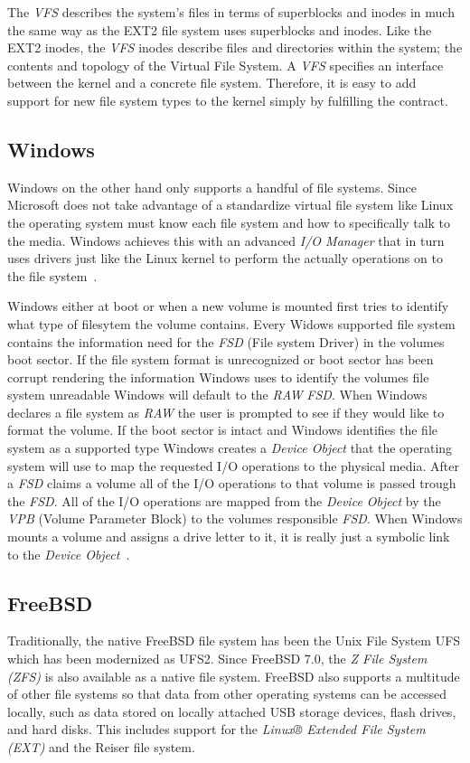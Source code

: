 \documentclass[10pt,draftclsnofoot,onecolumn,journal,compsoc]{IEEEtran}
\begin{document}
The \textit{VFS} describes the system's files in terms of superblocks and inodes in much the same way as the EXT2 file system uses superblocks and inodes. Like the EXT2 inodes, the \textit{VFS} inodes describe files and directories within the system; the contents and topology of the Virtual File System. A \textit{VFS} specifies an interface between the kernel and a concrete file system. Therefore, it is easy to add support for new file system types to the kernel simply by fulfilling the contract. 

\subsection*{Windows} 
Windows on the other hand only supports a handful of file systems. Since Microsoft does not take advantage of a standardize virtual file system like Linux the operating system must know each file system and how to specifically talk to the media. Windows achieves this with an advanced \textit{I/O Manager} that in turn uses drivers just like the Linux kernel to perform the actually operations on to the file system~\cite{Wini}. 

Windows either at boot or when a new volume is mounted first tries to identify what type of filesytem the volume contains. Every Widows supported file system contains the information need for the \textit{FSD} (File system Driver) in the volumes boot sector. If the file system format is unrecognized or boot sector has been corrupt rendering the information Windows uses to identify the volumes file system unreadable Windows will default to the \textit{RAW} \textit{FSD}. When Windows declares a file system as \textit{RAW} the user is prompted to see if they would like to format the volume. If the boot sector is intact and Windows identifies the file system as a supported type Windows creates a \textit{Device Object} that the operating system will use to map the requested I/O operations to the physical media. After a \textit{FSD} claims a volume all of the I/O operations to that volume is passed trough the \textit{FSD}. All of the I/O operations are mapped from the \textit{Device Object} by the \textit{VPB} (Volume Parameter Block) to the volumes responsible \textit{FSD}. When Windows mounts a volume and assigns a drive letter to it, it is really just a symbolic link to the \textit{Device Object}~\cite{Wini}.

\subsection*{FreeBSD}
Traditionally, the native FreeBSD file system has been the Unix File System UFS which has been modernized as UFS2. Since FreeBSD 7.0, the \textit{Z File System (ZFS)} is also available as a native file system. FreeBSD also supports a multitude of other file systems so that data from other operating systems can be accessed locally, such as data stored on locally attached USB storage devices, flash drives, and hard disks. This includes support for the \textit{Linux® Extended File System (EXT)} and the Reiser file system.
\end{document}
